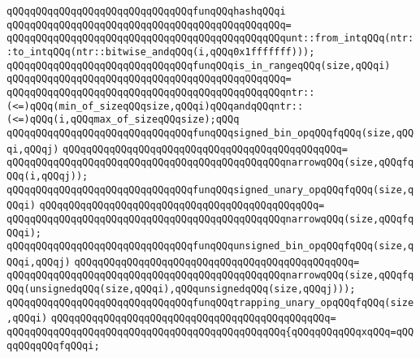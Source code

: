 \verb|qQQqqQQqqQQqqQQqqQQqqQQqqQQqqQQqfunqQQqhashqQQqi|\newline
\verb|qQQqqQQqqQQqqQQqqQQqqQQqqQQqqQQqqQQqqQQqqQQqqQQq=|\newline
\verb|qQQqqQQqqQQqqQQqqQQqqQQqqQQqqQQqqQQqqQQqqQQqqQQqunt::from_intqQQq(ntr::to_intqQQq(ntr::bitwise_andqQQq(i,qQQq0x1fffffff)));|\newline
\newline
\verb|qQQqqQQqqQQqqQQqqQQqqQQqqQQqqQQqfunqQQqis_in_rangeqQQq(size,qQQqi)|\newline
\verb|qQQqqQQqqQQqqQQqqQQqqQQqqQQqqQQqqQQqqQQqqQQqqQQq=|\newline
\verb|qQQqqQQqqQQqqQQqqQQqqQQqqQQqqQQqqQQqqQQqqQQqqQQqntr::(<=)qQQq(min_of_sizeqQQqsize,qQQqi)qQQqandqQQqntr::(<=)qQQq(i,qQQqmax_of_sizeqQQqsize);qQQq|\newline
\newline
\verb|qQQqqQQqqQQqqQQqqQQqqQQqqQQqqQQqfunqQQqsigned_bin_opqQQqfqQQq(size,qQQqi,qQQqj)|\newline
\verb|qQQqqQQqqQQqqQQqqQQqqQQqqQQqqQQqqQQqqQQqqQQqqQQq=|\newline
\verb|qQQqqQQqqQQqqQQqqQQqqQQqqQQqqQQqqQQqqQQqqQQqqQQqnarrowqQQq(size,qQQqfqQQq(i,qQQqj));|\newline
\newline
\verb|qQQqqQQqqQQqqQQqqQQqqQQqqQQqqQQqfunqQQqsigned_unary_opqQQqfqQQq(size,qQQqi)|\newline
\verb|qQQqqQQqqQQqqQQqqQQqqQQqqQQqqQQqqQQqqQQqqQQqqQQq=|\newline
\verb|qQQqqQQqqQQqqQQqqQQqqQQqqQQqqQQqqQQqqQQqqQQqqQQqnarrowqQQq(size,qQQqfqQQqi);|\newline
\newline
\verb|qQQqqQQqqQQqqQQqqQQqqQQqqQQqqQQqfunqQQqunsigned_bin_opqQQqfqQQq(size,qQQqi,qQQqj)|\newline
\verb|qQQqqQQqqQQqqQQqqQQqqQQqqQQqqQQqqQQqqQQqqQQqqQQq=|\newline
\verb|qQQqqQQqqQQqqQQqqQQqqQQqqQQqqQQqqQQqqQQqqQQqqQQqnarrowqQQq(size,qQQqfqQQq(unsignedqQQq(size,qQQqi),qQQqunsignedqQQq(size,qQQqj)));|\newline
\newline
\verb|qQQqqQQqqQQqqQQqqQQqqQQqqQQqqQQqfunqQQqtrapping_unary_opqQQqfqQQq(size,qQQqi)|\newline
\verb|qQQqqQQqqQQqqQQqqQQqqQQqqQQqqQQqqQQqqQQqqQQqqQQq=|\newline
\verb|qQQqqQQqqQQqqQQqqQQqqQQqqQQqqQQqqQQqqQQqqQQqqQQq{qQQqqQQqqQQqxqQQq=qQQqqQQqqQQqfqQQqi;|\newline
